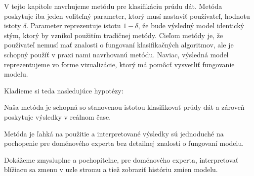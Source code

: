 V tejto kapitole navrhujeme metódu pre klasifikáciu prúdu dát. Metóda poskytuje iba jeden voliteľný parameter, ktorý musí nastaviť používateľ, hodnotu istoty $\delta$. Parameter reprezentuje istotu $1-\delta$, že bude výsledný model identický stým, ktorý by vznikol použitím tradičnej metódy. Cieľom metódy je, že používateľ nemusí mať znalosti o fungovaní klasifikačných algoritmov, ale je schopný použíť v praxi nami navrhovanú metódu. Naviac, výsledná model reprezentujeme vo forme vizualizácie, ktorý má pomôcť vysvetliť fungovanie modelu.

Kladieme si teda nasledujúce hypotézy:
\begin{hypothesis}{Naša metóda je schopná so stanovenou istotou klasifikovať prúdy dát a zároveň poskytuje výsledky v reálnom čase.}
\end{hypothesis}
\begin{hypothesis}{Metóda je ľahká na použitie a interpretované výsledky sú jednoduché na pochopenie pre doménového experta bez detailnej znalosti o fungovaní modelu.}
\end{hypothesis}
\begin{hypothesis}{Dokážeme zmysluplne a pochopiteľne, pre doménového experta, interpretovať blížiacu sa zmenu v uzle stromu a tiež zobraziť históriu zmien modelu.}
\end{hypothesis}





